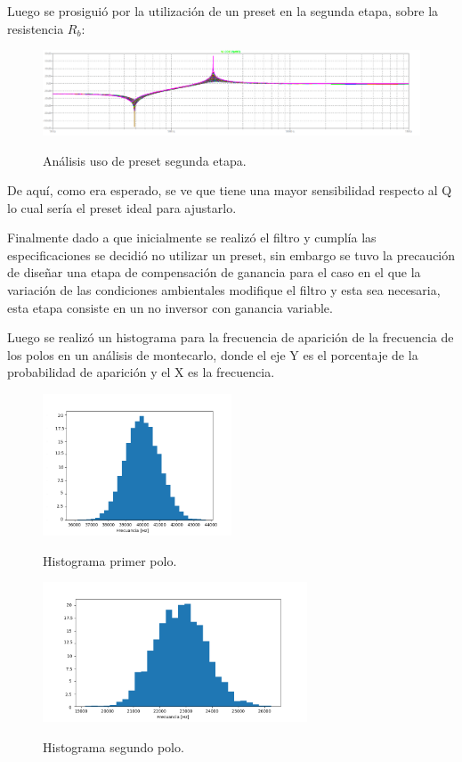 Luego se prosiguió por la utilización de un preset en la segunda etapa, sobre la resistencia $R_b$:
\begin{figure}[H]
	\centering
	\includegraphics[width=\textwidth]{Imagenes-Ej3/mcPoteR3E2.png}
	\label{fig:presete2}
	\caption{Análisis uso de preset segunda etapa.}
\end{figure}
 De aquí, como era esperado, se ve que tiene una mayor sensibilidad respecto al Q lo cual sería el preset ideal para ajustarlo.

Finalmente dado a que inicialmente se realizó el filtro y cumplía las especificaciones se decidió no utilizar un preset, sin embargo se tuvo la precaución de diseñar una etapa de compensación de ganancia para el caso en el que la variación de las condiciones ambientales modifique el filtro y esta sea necesaria, esta etapa consiste en un no inversor con ganancia variable.

Luego se realizó un histograma para la frecuencia de  aparición de la frecuencia de los polos en un análisis de montecarlo, donde el eje Y es el porcentaje de la probabilidad de aparición y el X es la frecuencia.
\begin{figure}[H]
	\centering
	\includegraphics[width=0.5\textwidth]{Imagenes-Ej3/histW01.png}
	\label{fig:hist1}
	\caption{Histograma primer polo.}
\end{figure}
\begin{figure}[H]
	\centering
	\includegraphics[width=0.7\textwidth]{Imagenes-Ej3/histW02.png}
	\label{fig:hist2}
	\caption{Histograma segundo polo.}
\end{figure}
